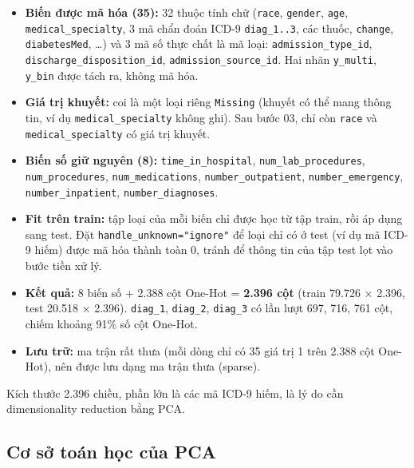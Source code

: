 \documentclass[a4paper]{report}
\begin{document}
\begin{itemize}
  \item \textbf{Biến được mã hóa (35):} 32 thuộc tính chữ (\texttt{race}, \texttt{gender}, \texttt{age}, \texttt{medical\_\allowbreak{}specialty}, 3 mã chẩn đoán ICD-9 \texttt{diag\_\allowbreak{}1..3}, các thuốc, \texttt{change}, \texttt{diabetesMed}, …) và 3 mã số thực chất là mã loại: \texttt{admission\_\allowbreak{}type\_\allowbreak{}id}, \texttt{discharge\_\allowbreak{}disposition\_\allowbreak{}id}, \texttt{admission\_\allowbreak{}source\_\allowbreak{}id}. Hai nhãn \texttt{y\_\allowbreak{}multi}, \texttt{y\_\allowbreak{}bin} được tách ra, không mã hóa.
  \item \textbf{Giá trị khuyết:} coi là một loại riêng \texttt{Missing} (khuyết có thể mang thông tin, ví dụ \texttt{medical\_\allowbreak{}specialty} không ghi). Sau bước 03, chỉ còn \texttt{race} và \texttt{medical\_\allowbreak{}specialty} có giá trị khuyết.
  \item \textbf{Biến số giữ nguyên (8):} \texttt{time\_\allowbreak{}in\_\allowbreak{}hospital}, \texttt{num\_\allowbreak{}lab\_\allowbreak{}procedures}, \texttt{num\_\allowbreak{}procedures}, \texttt{num\_\allowbreak{}medications}, \texttt{number\_\allowbreak{}outpatient}, \texttt{number\_\allowbreak{}emergency}, \texttt{number\_\allowbreak{}inpatient}, \texttt{number\_\allowbreak{}diagnoses}.
  \item \textbf{Fit trên train:} tập loại của mỗi biến chỉ được học từ tập train, rồi áp dụng sang test. Đặt \texttt{handle\_\allowbreak{}unknown="ignore"} để loại chỉ có ở test (ví dụ mã ICD-9 hiếm) được mã hóa thành toàn 0, tránh để thông tin của tập test lọt vào bước tiền xử lý.
  \item \textbf{Kết quả:} 8 biến số + 2.388 cột One-Hot = \textbf{2.396 cột} (train 79.726 × 2.396, test 20.518 × 2.396). \texttt{diag\_\allowbreak{}1}, \texttt{diag\_\allowbreak{}2}, \texttt{diag\_\allowbreak{}3} có lần lượt 697, 716, 761 cột, chiếm khoảng 91\% số cột One-Hot.
  \item \textbf{Lưu trữ:} ma trận rất thưa (mỗi dòng chỉ có 35 giá trị 1 trên 2.388 cột One-Hot), nên được lưu dạng ma trận thưa (sparse).
\end{itemize}

Kích thước 2.396 chiều, phần lớn là các mã ICD-9 hiếm, là lý do cần dimensionality reduction bằng PCA.

\subsection{Cơ sở toán học của PCA}
\end{document}
